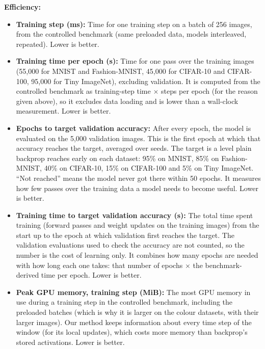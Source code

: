 \documentclass{article}
\begin{document}
{\noindent\textbf{Efficiency:}
\begin{itemize}
  \item \textbf{Training step (ms):} Time for one training step on a batch of 256 images, from the controlled benchmark (same preloaded data, models interleaved, repeated). Lower is better.
  \item \textbf{Training time per epoch (s):} Time for one pass over the training images (55,000 for MNIST and Fashion-MNIST, 45,000 for CIFAR-10 and CIFAR-100, 95,000 for Tiny ImageNet), excluding validation. It is computed from the controlled benchmark as training-step time $\times$ steps per epoch (for the reason given above), so it excludes data loading and is lower than a wall-clock measurement. Lower is better.
  \item \textbf{Epochs to target validation accuracy:} After every epoch, the model is evaluated on the 5,000 validation images. This is the first epoch at which that accuracy reaches the target, averaged over seeds. The target is a level plain backprop reaches early on each dataset: 95\% on MNIST, 85\% on Fashion-MNIST, 40\% on CIFAR-10, 15\% on CIFAR-100 and 5\% on Tiny ImageNet. ``Not reached'' means the model never got there within 50 epochs. It measures how few passes over the training data a model needs to become useful. Lower is better.
  \item \textbf{Training time to target validation accuracy (s):} The total time spent training (forward passes and weight updates on the training images) from the start up to the epoch at which validation first reaches the target. The validation evaluations used to check the accuracy are not counted, so the number is the cost of learning only. It combines how many epochs are needed with how long each one takes: that number of epochs $\times$ the benchmark-derived time per epoch. Lower is better.
  \item \textbf{Peak GPU memory, training step (MiB):} The most GPU memory in use during a training step in the controlled benchmark, including the preloaded batches (which is why it is larger on the colour datasets, with their larger images). Our method keeps information about every time step of the window (for its local updates), which costs more memory than backprop's stored activations. Lower is better.
\end{itemize}

}
\end{document}
